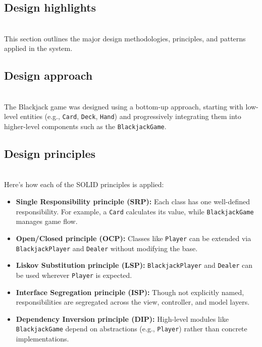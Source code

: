 \subsection{Design highlights}\label{Hghy9taE-Du6qHFUXjAfu}
\\
This section outlines the major design methodologies, principles, and patterns applied in the system.

\subsection{Design approach}\label{iHVbgiyqcMA89bPRikDAD}
\\
The Blackjack game was designed using a bottom-up approach, starting with low-level entities (e.g., \texttt{Card}, \texttt{Deck}, \texttt{Hand}) and progressively integrating them into higher-level components such as the \texttt{BlackjackGame}.

\subsection{Design principles}\label{nDx3wq8qPY_5MH-2MQxkr}
\\
Here's how each of the SOLID principles is applied:

\begin{itemize}
\item
\protect{}\label{4NYbgu_RF-vEebmGwvzJ2}
\textbf{Single Responsibility principle (SRP):} Each class has one well-defined responsibility. For example, a \texttt{Card} calculates its value, while \texttt{BlackjackGame} manages game flow.
\item
\protect{}\label{brMSYkAnEBcWA0vSmMR0b}
\textbf{Open/Closed principle (OCP):} Classes like \texttt{Player} can be extended via \texttt{BlackjackPlayer} and \texttt{Dealer} without modifying the base.
\item
\protect{}\label{dgGkvzalMduslEJV297oH}
\textbf{Liskov Substitution principle (LSP):} \texttt{BlackjackPlayer} and \texttt{Dealer} can be used wherever \texttt{Player} is expected.
\item
\protect{}\label{rmkk65rNptMV0lKprLV95}
\textbf{Interface Segregation principle (ISP):} Though not explicitly named, responsibilities are segregated across the view, controller, and model layers.
\item
\protect{}\label{LKQkXsvPsJq2JIvaUD-T4}
\textbf{Dependency Inversion principle (DIP):} High-level modules like \texttt{BlackjackGame} depend on abstractions (e.g., \texttt{Player}) rather than concrete implementations.
\end{itemize}

